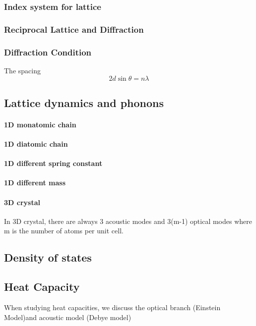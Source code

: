 \documentclass[12pt,a4paper]{article}
\begin{document}
        \subsubsection{Index system for lattice}
        \subsubsection{Reciprocal Lattice and Diffraction}
        \subsubsection{Diffraction Condition}
        The spacing 
        \begin{equation}
            2 d \sin \theta=n \lambda
        \end{equation}
\subsection{Lattice dynamics and phonons}
\paragraph{1D monatomic chain}
\paragraph{1D diatomic chain}
\paragraph{1D different spring constant}
\paragraph{1D different mass}
\paragraph{3D crystal}
In 3D crystal, there are always 3 acoustic modes and 3(m-1) optical modes where m is the number of atoms per unit cell.
\subsection{Density of states}
\subsection{Heat Capacity} 
    When studying heat capacities, we discuss the optical branch (Einstein Model)and acoustic model (Debye model)
\end{document}
